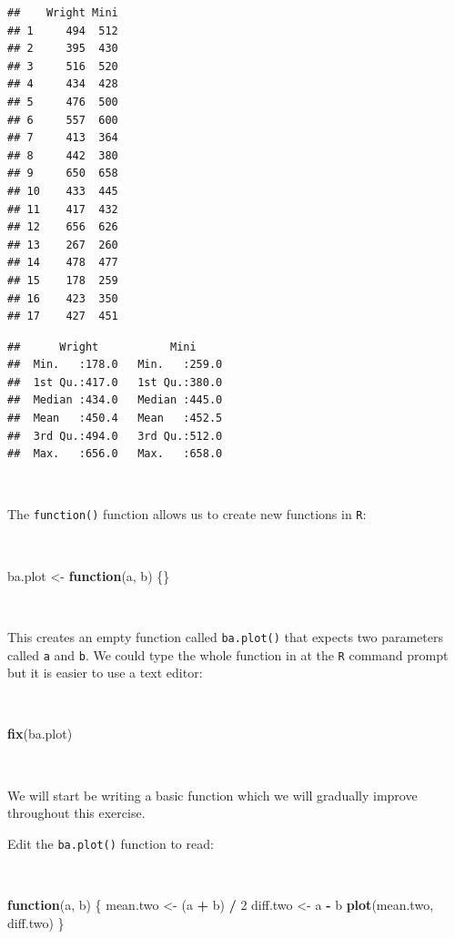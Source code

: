 \documentclass[12pt,a4paper]{book}
\newenvironment{Shaded}{\begin{snugshade}}{\end{snugshade}}
\newcommand{\KeywordTok}[1]{\textcolor[rgb]{0.13,0.29,0.53}{\textbf{#1}}}
\newcommand{\DecValTok}[1]{\textcolor[rgb]{0.00,0.00,0.81}{#1}}
\newcommand{\StringTok}[1]{\textcolor[rgb]{0.31,0.60,0.02}{#1}}
\newcommand{\ControlFlowTok}[1]{\textcolor[rgb]{0.13,0.29,0.53}{\textbf{#1}}}
\newcommand{\OperatorTok}[1]{\textcolor[rgb]{0.81,0.36,0.00}{\textbf{#1}}}
\newcommand{\NormalTok}[1]{#1}
\theoremstyle{definition}
\theoremstyle{definition}
\theoremstyle{definition}
\theoremstyle{remark}
\begin{document}
\begin{verbatim}
##    Wright Mini
## 1     494  512
## 2     395  430
## 3     516  520
## 4     434  428
## 5     476  500
## 6     557  600
## 7     413  364
## 8     442  380
## 9     650  658
## 10    433  445
## 11    417  432
## 12    656  626
## 13    267  260
## 14    478  477
## 15    178  259
## 16    423  350
## 17    427  451
\end{verbatim}

\begin{verbatim}
##      Wright           Mini      
##  Min.   :178.0   Min.   :259.0  
##  1st Qu.:417.0   1st Qu.:380.0  
##  Median :434.0   Median :445.0  
##  Mean   :450.4   Mean   :452.5  
##  3rd Qu.:494.0   3rd Qu.:512.0  
##  Max.   :656.0   Max.   :658.0
\end{verbatim}

~

The \texttt{function()} function allows us to create new functions in
\texttt{R}:

~

\begin{Shaded}
\begin{Highlighting}[]
\NormalTok{ba.plot <-}\StringTok{ }\ControlFlowTok{function}\NormalTok{(a, b) \{\}}
\end{Highlighting}
\end{Shaded}

~

This creates an empty function called \texttt{ba.plot()} that expects
two parameters called \texttt{a} and \texttt{b}. We could type the whole
function in at the \texttt{R} command prompt but it is easier to use a
text editor:

~

\begin{Shaded}
\begin{Highlighting}[]
\KeywordTok{fix}\NormalTok{(ba.plot)}
\end{Highlighting}
\end{Shaded}

~

We will start be writing a basic function which we will gradually
improve throughout this exercise.

Edit the \texttt{ba.plot()} function to read:

~

\begin{Shaded}
\begin{Highlighting}[]
\ControlFlowTok{function}\NormalTok{(a, b) \{}
\NormalTok{  mean.two <-}\StringTok{ }\NormalTok{(a }\OperatorTok{+}\StringTok{ }\NormalTok{b) }\OperatorTok{/}\StringTok{ }\DecValTok{2}
\NormalTok{  diff.two <-}\StringTok{ }\NormalTok{a }\OperatorTok{-}\StringTok{ }\NormalTok{b}
  \KeywordTok{plot}\NormalTok{(mean.two, diff.two)}
\NormalTok{\}}
\end{Highlighting}
\end{Shaded}
\end{document}
